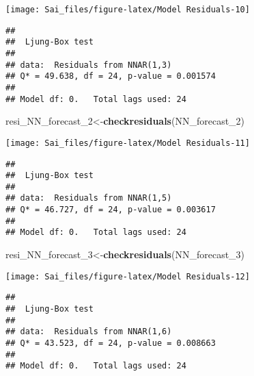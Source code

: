 \documentclass[
]{article}
\newenvironment{Shaded}{\begin{snugshade}}{\end{snugshade}}
\newcommand{\FunctionTok}[1]{\textcolor[rgb]{0.13,0.29,0.53}{\textbf{#1}}}
\newcommand{\NormalTok}[1]{#1}
\newcommand{\OtherTok}[1]{\textcolor[rgb]{0.56,0.35,0.01}{#1}}
\begin{document}
\begin{center}\texttt{[image: Sai\_files/figure-latex/Model Residuals-10]} \end{center}

\begin{verbatim}
## 
##  Ljung-Box test
## 
## data:  Residuals from NNAR(1,3)
## Q* = 49.638, df = 24, p-value = 0.001574
## 
## Model df: 0.   Total lags used: 24
\end{verbatim}

\begin{Shaded}
\begin{Highlighting}[]
\NormalTok{resi\_NN\_forecast\_2}\OtherTok{\textless{}{-}}\FunctionTok{checkresiduals}\NormalTok{(NN\_forecast\_2)}
\end{Highlighting}
\end{Shaded}

\begin{center}\texttt{[image: Sai\_files/figure-latex/Model Residuals-11]} \end{center}

\begin{verbatim}
## 
##  Ljung-Box test
## 
## data:  Residuals from NNAR(1,5)
## Q* = 46.727, df = 24, p-value = 0.003617
## 
## Model df: 0.   Total lags used: 24
\end{verbatim}

\begin{Shaded}
\begin{Highlighting}[]
\NormalTok{resi\_NN\_forecast\_3}\OtherTok{\textless{}{-}}\FunctionTok{checkresiduals}\NormalTok{(NN\_forecast\_3)}
\end{Highlighting}
\end{Shaded}

\begin{center}\texttt{[image: Sai\_files/figure-latex/Model Residuals-12]} \end{center}

\begin{verbatim}
## 
##  Ljung-Box test
## 
## data:  Residuals from NNAR(1,6)
## Q* = 43.523, df = 24, p-value = 0.008663
## 
## Model df: 0.   Total lags used: 24
\end{verbatim}
\end{document}
